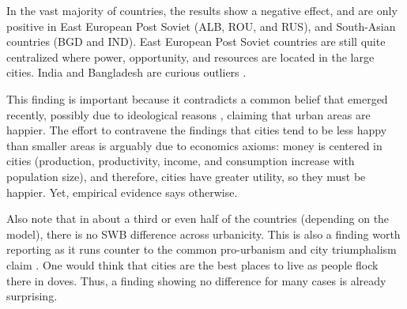 \documentclass[11pt, letterpaper]{article}
\begin{document}
{%


In the vast majority of countries, the results show a negative effect, and are only positive in East European Post Soviet (ALB, ROU, and RUS), and South-Asian countries (BGD and IND).
East European Post Soviet countries are still quite centralized where power, opportunity, and resources are located in the large cities. %
India and Bangladesh are curious outliers \citep[for some discussion
see][]{deb2020exploring}.
}
This finding is important because it contradicts a common belief that
emerged recently, possibly due to ideological reasons \citep[e.g.,][]{glaeser11,glaeser14,burger20}, claiming that urban areas are happier. The effort to contravene the findings that cities tend to be less happy than smaller areas is arguably due to economics axioms: money is centered in cities (production, productivity, income, and consumption increase with population size), and therefore, cities have greater utility, so they must be happier. Yet, empirical evidence says otherwise.

Also note that in about a third or even half of the countries (depending on the
model), there is no SWB difference across urbanicity. This is also a finding
worth reporting as it runs counter to the common pro-urbanism and city triumphalism claim \citep[e.g.,][]{glaeser11}.
%
One would think that cities are the best places to live as people flock there in doves.
Thus, a finding showing no difference for many cases is already surprising.
\end{document}
